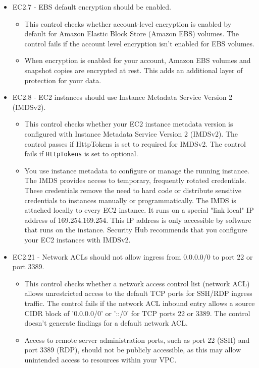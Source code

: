 \begin{mdframed}[backgroundcolor=gray!05, linecolor=gray!50]
\begin{itemize}
    \item EC2.7 - EBS default encryption should be enabled.
    \begin{itemize}
        \item This control checks whether account-level encryption is enabled by default for Amazon Elastic Block Store (Amazon EBS) volumes. The control fails if the account level encryption isn't enabled for EBS volumes.
        \item When encryption is enabled for your account, Amazon EBS volumes and snapshot copies are encrypted at rest. This adds an additional layer of protection for your data.
    \end{itemize}
    \item EC2.8 - EC2 instances should use Instance Metadata Service Version 2 (IMDSv2).
    \begin{itemize}
        \item This control checks whether your EC2 instance metadata version is configured with Instance Metadata Service Version 2 (IMDSv2). The control passes if HttpTokens is set to required for IMDSv2. The control fails if \texttt{HttpTokens} is set to optional.
        \item You use instance metadata to configure or manage the running instance. The IMDS provides access to temporary, frequently rotated credentials. These credentials remove the need to hard code or distribute sensitive credentials to instances manually or programmatically. The IMDS is attached locally to every EC2 instance. It runs on a special "link local" IP address of 169.254.169.254. This IP address is only accessible by software that runs on the instance. Security Hub recommends that you configure your EC2 instances with IMDSv2.
    \end{itemize}
    \item EC2.21 - Network ACLs should not allow ingress from 0.0.0.0/0 to port 22 or port 3389.
    \begin{itemize}
        \item This control checks whether a network access control list (network ACL) allows unrestricted access to the default TCP ports for SSH/RDP ingress traffic. The control fails if the network ACL inbound entry allows a source CIDR block of '0.0.0.0/0' or '::/0' for TCP ports 22 or 3389. The control doesn't generate findings for a default network ACL.
        \item Access to remote server administration ports, such as port 22 (SSH) and port 3389 (RDP), should not be publicly accessible, as this may allow unintended access to resources within your VPC.

\end{itemize}
\end{itemize}
\end{mdframed}
